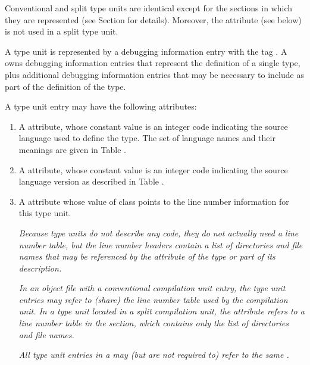 Conventional and split type units are identical except for
the sections in which they are represented 
(see Section  for details).
Moreover, the 
\bb
\DWATstroffsets{} 
\eb
attribute (see below) is not 
used in a split type unit.

A type unit is represented by a debugging information entry
with the tag \DWTAGtypeunitTARG. 
A  owns debugging
information entries that represent the definition of a single
type, plus additional debugging information entries that may
be necessary to include as part of the definition of the type.

A type unit entry may have the following attributes:
\begin{enumerate}[1. ]

\item A
\bb
\DWATlanguagename{} attribute, 
whose
\eb
{}
constant value is an integer code indicating the source
language used to define the type. The set of language names
and their meanings are given in Table .

\bb
\item A \DWATlanguageversion{} attribute, whose constant value is an 
integer code indicating the source language version as described in
Table .
\eb

\item A \DWATstmtlist{} attribute
whose value of class \CLASSlineptr{} points to the line number 
information for this type unit.

\textit{Because type units do not describe any code, they
do not actually need a line number table, but the line number
headers contain a list of directories and file names that
may be referenced by the \DWATdeclfile{} attribute of the
type or part of its description.} 

\textit{In an object file with a conventional compilation 
unit entry, the type unit entries may refer to (share) the 
line number table used by the compilation unit. In a type 
unit located in a split compilation unit, the 
\DWATstmtlistNAME{} attribute refers to a 
line number table in the \dotdebuglinedwo{} section, which
contains only the list of directories and file names.}

\textit{All type unit entries in a \splitDWARFobjectfile{} may 
(but are not required to) refer to the same 
.}


\end{enumerate}
